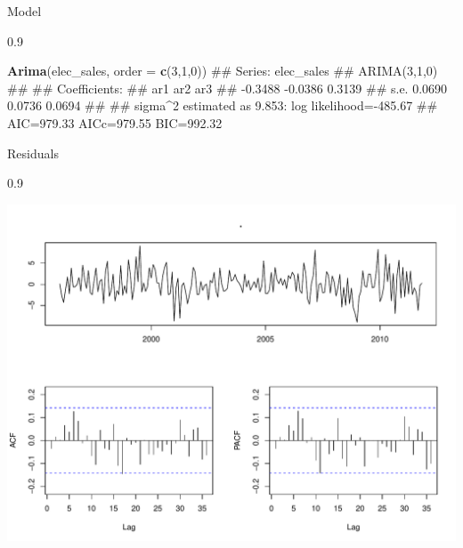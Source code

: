 \documentclass[11pt,ignorenonframetext,]{beamer}
\newenvironment{Shaded}{}{}
\newcommand{\KeywordTok}[1]{\textcolor[rgb]{0.00,0.44,0.13}{\textbf{#1}}}
\newcommand{\DataTypeTok}[1]{\textcolor[rgb]{0.56,0.13,0.00}{#1}}
\newcommand{\DecValTok}[1]{\textcolor[rgb]{0.25,0.63,0.44}{#1}}
\newcommand{\StringTok}[1]{\textcolor[rgb]{0.25,0.44,0.63}{#1}}
\newcommand{\OtherTok}[1]{\textcolor[rgb]{0.00,0.44,0.13}{#1}}
\newcommand{\OperatorTok}[1]{\textcolor[rgb]{0.40,0.40,0.40}{#1}}
\newcommand{\NormalTok}[1]{#1}
\let\oldShaded\Shaded
\let\endoldShaded\endShaded
\renewenvironment{Shaded}{\footnotesize\begin{spacing}{0.9}\oldShaded}{\endoldShaded\end{spacing}}
\begin{document}
\begin{frame}[fragile,t]{Model}

\begin{Shaded}
\begin{Highlighting}[]
\KeywordTok{Arima}\NormalTok{(elec_sales, }\DataTypeTok{order =} \KeywordTok{c}\NormalTok{(}\DecValTok{3}\NormalTok{,}\DecValTok{1}\NormalTok{,}\DecValTok{0}\NormalTok{))}
\NormalTok{## Series: elec_sales }
\NormalTok{## ARIMA(3,1,0)                    }
\NormalTok{## }
\NormalTok{## Coefficients:}
\NormalTok{##           ar1      ar2     ar3}
\NormalTok{##       -0.3488  -0.0386  0.3139}
\NormalTok{## s.e.   0.0690   0.0736  0.0694}
\NormalTok{## }
\NormalTok{## sigma^2 estimated as 9.853:  log likelihood=-485.67}
\NormalTok{## AIC=979.33   AICc=979.55   BIC=992.32}
\end{Highlighting}
\end{Shaded}

\end{frame}

\begin{frame}[fragile]{Residuals}

\begin{Shaded}
\end{Shaded}

\includegraphics{Lec9_files/figure-beamer/unnamed-chunk-18-1.pdf}

\end{frame}
\end{document}
